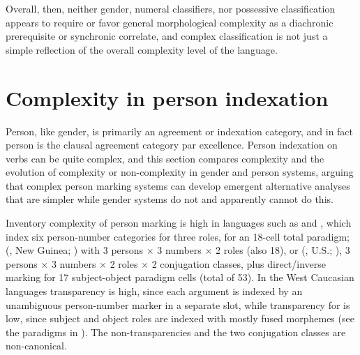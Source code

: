 \documentclass[output=collectionpaper]{langsci/langscibook}
\begin{document}
Overall, then, neither gender, numeral classifiers, nor possessive classification appears to require or favor general morphological complexity as a diachronic prerequisite or synchronic correlate, and complex classification is not just a simple reflection of the overall complexity level of the language.




\section{Complexity in person indexation}
\label{sec:Nich:5}

Person, like gender, is primarily an agreement or indexation category, and in fact person is the clausal agreement category par excellence. Person indexation on verbs can be quite complex, and this section compares complexity and the evolution of complexity or non-complexity in gender and person systems, arguing that complex person marking systems can develop emergent alternative analyses that are simpler while gender systems do not and apparently cannot do this.

Inventory complexity of person marking is high in  languages such as  and , which index six person-number categories for three roles, for an 18-cell total paradigm;  (, New Guinea; \citealt{Foley1991}) with 3 persons $\times$ 3 numbers $\times$ 2 roles (also 18), or  (, U.S.; \citealt{Watkins1984}), 3 persons $\times$ 3 numbers $\times$ 2 roles $\times$ 2 conjugation classes, plus direct/inverse marking for 17 subject-object paradigm cells (total of 53). In the West Caucasian languages transparency is high, since each argument is indexed by an unambiguous person-number marker in a separate slot, while transparency for  is low, since subject and object roles are indexed with mostly fused morphemes (see the paradigms in \citealt[115--116]{Watkins1984}). The  non-transparencies and the two conjugation classes are non-canonical.
\end{document}
